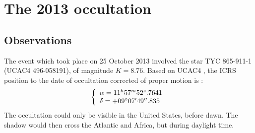 \documentclass[useAMS,usenatbib]{mn2e}
\begin{document}
\section{The 2013 occultation}

\subsection{Observations}\label{Sec: observation-2013}

The event which took place on 25 October 2013 involved the star TYC 865-911-1 (UCAC4 496-058191), of magnitude $K = 8.76$. Based on UCAC4 \citep{Zacharias2013}, the ICRS position to the date of occultation corrected of proper motion is :
%
\begin{equation}
\left\{ 
  \begin{array}{l l}
    \alpha = 11^{h}57^{m}52^{s}.7641\\
    \delta = +09\hbox{$^\circ$} 07\hbox{$^\prime$} 49\hbox{$^{\prime\prime}$}.835
  \end{array}
\right.
\end{equation}
%
The occultation could only be visible in the United States, before dawn. The shadow would then cross the Atlantic and Africa, but during daylight time.
\end{document}
